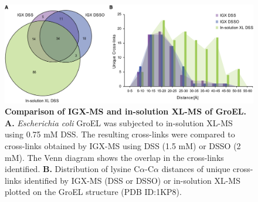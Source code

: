 \begin{figure}[hbt!]
\center
\includegraphics[width=\textwidth]{Chapter.2/Figures/Fig3.jpg} 
\caption{\textbf{Comparison of IGX-MS and in-solution XL-MS of GroEL.} \textbf{A.} \emph{Escherichia coli} GroEL was subjected to in-solution XL-MS using 0.75 mM DSS. The resulting cross-links were compared to cross-links obtained by IGX-MS using DSS (1.5 mM) or DSSO (2 mM). The Venn diagram shows the overlap in the cross-links identified. \textbf{B.} Distribution of lysine C$\alpha$-C$\alpha$ distances of unique cross-links identified by IGX-MS (DSS or DSSO) or in-solution XL-MS plotted on the GroEL structure (PDB ID:1KP8).}
\label{fig:ch2_fig3}
\end{figure}

